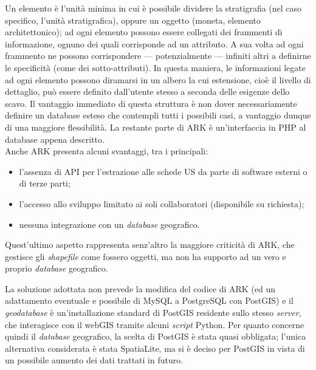 \documentclass{paper}
\begin{document}
        Un elemento è l'unità minima in cui è possibile dividere la stratigrafia (nel caso specifico, l'unità stratigrafica), oppure un oggetto (moneta, elemento architettonico); ad ogni elemento possono essere collegati dei frammenti di informazione, ognuno dei quali corrisponde ad un attributo. A sua volta ad ogni frammento ne possono corrispondere --- potenzialmente --- infiniti altri a definirne le specificità (come dei sotto-attributi). In questa maniera, le informazioni legate ad ogni elemento possono diramarsi in un albero la cui estensione, cioè il livello di dettaglio, può essere definito dall'utente stesso a seconda delle esigenze dello scavo. Il vantaggio immediato di questa struttura è non dover necessariamente definire un database esteso che contempli tutti i possibili casi, a vantaggio dunque di una maggiore flessibilità. La restante parte di ARK è un'interfaccia in PHP al database appena descritto.\\

        Anche ARK presenta alcuni svantaggi, tra i principali:

        \begin{itemize}
            \item l'assenza di API per l'estrazione alle schede US da parte di software esterni o di terze parti;
            \item l'accesso allo sviluppo limitato ai soli collaboratori (disponibile su richiesta);
            \item nessuna integrazione con un \textit{database} geografico.
        \end{itemize}

        Quest'ultimo aspetto rappresenta senz'altro la maggiore criticità di ARK, che gestisce gli \textit{shapefile} come fossero oggetti, ma non ha supporto ad un vero e proprio \textit{database} geografico.

        La soluzione adottata non prevede la modifica del codice di ARK (ed un adattamento eventuale e possibile di MySQL a PostgreSQL con PostGIS) e il \textit{geodatabase} è un'installazione standard di PostGIS residente sullo stesso \textit{server}, che interagisce con il webGIS tramite alcuni \textit{script} Python. Per quanto concerne quindi il \textit{database} geografico, la scelta di PostGIS è stata quasi obbligata; l'unica alternativa considerata è stata SpatiaLite, ma si è deciso per PostGIS in vista di un possibile aumento dei dati trattati in futuro.
\end{document}
